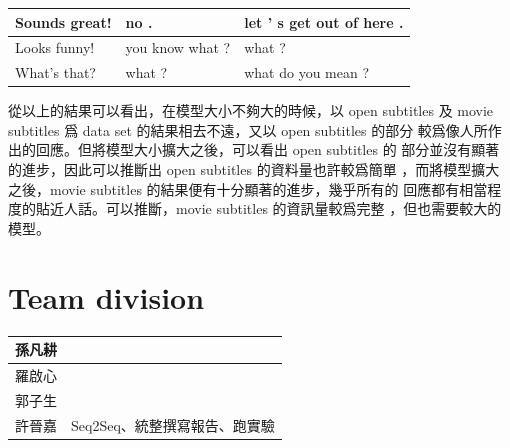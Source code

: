 \documentclass[12pt, a4paper]{article}
\theoremstyle{mystyle}	%
\begin{document}
\begin{enumerate}
\begin{enumerate}
\begin{tabular}{lll}
      \hline
      Sounds great!       & no .                      & let ' s get out of here . \\
      \hline
      Looks funny!        & you know what ?           & what ? \\
      \hline
      What's that?        & what ?                    & what do you mean ? \\
      \hline
    \end{tabular}
  \end{enumerate}
  從以上的結果可以看出，在模型大小不夠大的時候，以 open subtitles 及
  movie subtitles 爲 data set 的結果相去不遠，又以 open subtitles 的部分
  較爲像人所作出的回應。但將模型大小擴大之後，可以看出 open subtitles 的
  部分並沒有顯著的進步，因此可以推斷出 open subtitles 的資料量也許較爲簡單
  ，而將模型擴大之後，movie subtitles 的結果便有十分顯著的進步，幾乎所有的
  回應都有相當程度的貼近人話。可以推斷，movie subtitles 的資訊量較爲完整
  ，但也需要較大的模型。
\end{enumerate}

\section{Team division}
\begin{table}[h]
\centering
\begin{tabular}{ |C{2cm}|C{10cm}| }
  \hline
  孫凡耕 & \\
  \hline
  羅啟心 & \\
  \hline
  郭子生 & \\
  \hline
  許晉嘉 & Seq2Seq、統整撰寫報告、跑實驗\\
  \hline
\end{tabular}
\end{table}
\end{document}
